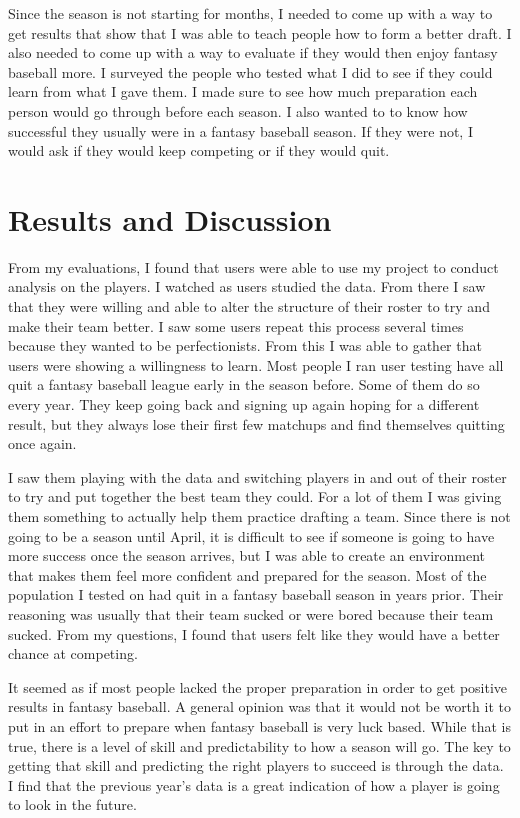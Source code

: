 \documentclass[10pt,twocolumn]{article}
\begin{document}
	Since the season is not starting for months, I needed to come up with a way to get results that show that I was able to teach people how to form a better draft. I also needed to come up with a way to evaluate if they would then enjoy fantasy baseball more. I surveyed the people who tested what I did to see if they could learn from what I gave them. I made sure to see how much preparation each person would go through before each season. I also wanted to to know how successful they usually were in a fantasy baseball season. If they were not, I would ask if they would keep competing or if they would quit.
	
\section{Results and Discussion}

	From my evaluations, I found that users were able to use my project to conduct analysis on the players. I watched as users studied the data. From there I saw that they were willing and able to alter the structure of their roster to try and make their team better. I saw some users repeat this process several times because they wanted to be perfectionists. From this I was able to gather that users were showing a willingness to learn. Most people I ran user testing have all quit a fantasy baseball league early in the season before. Some of them do so every year. They keep going back and signing up again hoping for a different result, but they always lose their first few matchups and find themselves quitting once again.
	
	I saw them playing with the data and switching players in and out of their roster to try and put together the best team they could. For a lot of them I was giving them something to actually help them practice drafting a team. Since there is not going to be a season until April, it is difficult to see if someone is going to have more success once the season arrives, but I was able to create an environment that makes them feel more confident and prepared for the season. Most of the population I tested on had quit in a fantasy baseball season in years prior. Their reasoning was usually that their team sucked or were bored because their team sucked. From my questions, I found that users felt like they would have a better chance at competing.
	
	It seemed as if most people lacked the proper preparation in order to get positive results in fantasy baseball. A general opinion was that it would not be worth it to put in an effort to prepare when fantasy baseball is very luck based. While that is true, there is a level of skill and predictability to how a season will go. The key to getting that skill and predicting the right players to succeed is through the data. I find that the previous year's data is a great indication of how a player is going to look in the future. 
	
\end{document}
